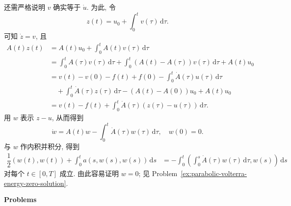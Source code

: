 还需严格说明 $v$ 确实等于 $\dot u$. 为此, 令
\begin{equation}\label{eq:parabolic-time-regularity-integrated-auxiliary-solution}
z(t)=u_0+\int_0^t v(\tau)\,\mathrm{d}\tau.
\end{equation}
可知 $\dot z=v$, 且\[\begin{aligned}
A(t)z(t)&=A(t)u_0+\int_0^t A(t)v(\tau)\,\mathrm{d}\tau\\
&=\int_0^t A(\tau)v(\tau)\,\mathrm{d}\tau+\int_0^t(A(t)-A(\tau))v(\tau)\,\mathrm{d}\tau+A(t)u_0\\
&=v(t)-v(0)-f(t)+f(0)-\int_0^t\dot A(\tau)u(\tau)\,\mathrm{d}\tau\\
&\quad+\int_0^t\dot A(\tau)z(\tau)\,\mathrm{d}\tau-(A(t)-A(0))u_0+A(t)u_0\\
&=v(t)-f(t)+\int_0^t\dot A(\tau)(z(\tau)-u(\tau))\,\mathrm{d}\tau.
\end{aligned}\]用 $w$ 表示 $z-u$, 从而得到
\begin{equation}\label{eq:parabolic-time-regularity-volterra-difference-problem}
\dot w=A(t)w-\int_0^t\dot A(\tau)w(\tau)\,\mathrm{d}\tau,\quad w(0)=0.
\end{equation}
与 $w$ 作内积并积分, 得到
\begin{equation}\label{eq:parabolic-time-regularity-volterra-energy-identity}
\begin{aligned}\dfrac{1}{2}(w(t),w(t))+\int_0^t a(s,w(s),w(s))\,\mathrm{d}s&=-\int_0^t\left(\int_0^s\dot A(\tau)w(\tau)\,\mathrm{d}\tau,w(s)\right)\,\mathrm{d}s\end{aligned}
\end{equation}
对每个 $t\in[0,T]$ 成立. 由此容易证明 $w=0$; 见 Problem~\ref{ex:parabolic-volterra-energy-zero-solution}.

\textbf{Problems}

